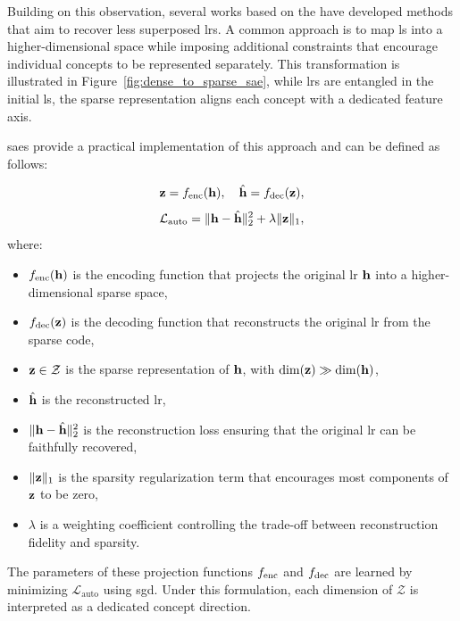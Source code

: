 Building on this observation, several works based on the \SuperpositionHypothesisName have developed methods that aim to recover less superposed \glspl{lr}.
A common approach is to map \gls{ls} into a higher-dimensional space while imposing additional constraints that encourage individual concepts to be represented separately.
This transformation is illustrated in Figure~\ref{fig:dense_to_sparse_sae}, while \glspl{lr} are entangled in the initial \gls{ls}, the sparse representation aligns each concept with a dedicated feature axis.



\glspl{sae} provide a practical implementation of this approach and can be defined as follows:
\begin{equationwhere}
\[
\vect{z} = \Encoder(\latentRepresentation), \quad \hat{\latentRepresentation} = \Decoder(\vect{z}),
\]
\[
\mathcal{L}_{\mathrm{auto}} = \|\latentRepresentation - \hat{\latentRepresentation}\|_2^2 + \lambda \|\vect{z}\|_1,
\]
where:
\begin{itemize}
    \item $\Encoder(\latentRepresentation)$ is the encoding function that projects the original \gls{lr} $\latentRepresentation$ into a higher-dimensional sparse space,
    \item $\Decoder(\vect{z})$ is the decoding function that reconstructs the original \gls{lr} from the sparse code,
    \item $\mathbf{z} \in \mathcal{Z}$ is the sparse representation of $\latentRepresentation$, with $\dim(\vect{z}) \gg \dim(\latentRepresentation)$,
    \item $\hat{\latentRepresentation}$ is the reconstructed \gls{lr},
    \item $\|\latentRepresentation - \hat{\latentRepresentation}\|_2^2$ is the reconstruction loss ensuring that the original \gls{lr} can be faithfully recovered,
    \item $\|\mathbf{z}\|_1$ is the sparsity regularization term that encourages most components of $\mathbf{z}$ to be zero,
    \item $\lambda$ is a weighting coefficient controlling the trade-off between reconstruction fidelity and sparsity.
\end{itemize}
\end{equationwhere}

The parameters of these projection functions $\Encoder$ and $\Decoder$ are learned by minimizing $\mathcal{L}_{\mathrm{auto}}$ using \gls{sgd}.
Under this formulation, each dimension of $\mathcal{Z}$ is interpreted as a dedicated concept direction.

